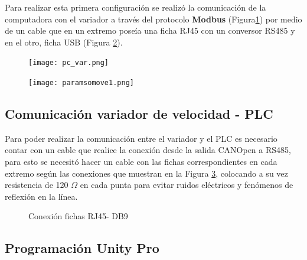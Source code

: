Para realizar esta primera configuración se realizó la comunicación de la computadora con el variador a través del protocolo \textbf{Modbus} (Figura\ref{fig:pcvar}) por medio de un cable que en un extremo poseía una ficha RJ45 con un conversor RS485 y en el otro, ficha USB (Figura \ref{fig:paramsomove1}). 
\begin{figure}[H]
	\centering
	\texttt{[image: pc\_var.png]}
	\label{fig:pcvar}
\end{figure}

\begin{figure}[H]
	\centering
	\texttt{[image: paramsomove1.png]}
	\label{fig:paramsomove1}
\end{figure}


\subsection{Comunicación variador de velocidad - PLC}
Para poder realizar la comunicación entre el variador y el PLC es necesario contar con un cable que realice la conexión desde la salida CANOpen a RS485, para esto se necesitó hacer un cable con las fichas correspondientes en cada extremo según las conexiones que muestran en la Figura \ref{fig:cable}, colocando a su vez resistencia de 120 $\Omega$ en cada punta para evitar ruidos eléctricos y fenómenos de reflexión en la línea.

\begin{figure}[htbp]
    \centering
    \caption{Conexión fichas RJ45- DB9} \label{fig:cable}
    \end{figure}



\subsection{Programación Unity Pro}


